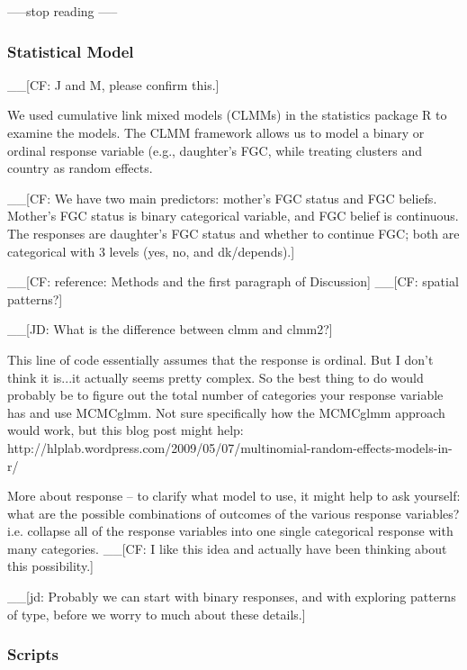 \documentclass[12pt,]{article}
\begin{document}
-----stop reading -----

\subsubsection{Statistical Model}\label{statistical-model}

\_\_{[}CF: J and M, please confirm this.{]} 

We used cumulative link mixed models (CLMMs) in the statistics package R \cite{Rstats,Rpackage_ordinal} to examine the models.  The CLMM framework allows us to model a binary or ordinal response variable (e.g., daughter's FGC, while treating clusters and country as random effects.

\_\_{[}CF: We have two main predictors:  mother's FGC status and FGC beliefs.  Mother's FGC status is binary categorical variable, and FGC belief is continuous.  The responses are daughter's FGC status and whether to continue FGC; both are categorical with 3 levels (yes, no, and dk/depends).{]} 

\_\_{[}CF: reference: Methods and the first paragraph of Discussion\cite{Chia14}{]}
\_\_{[}CF: spatial patterns?{]}

\_\_{[}JD: What is the difference between clmm and clmm2?{]}

This line of code essentially assumes that the response is ordinal. But I don't think it is...it actually seems pretty complex. So the best thing to do would probably be to figure out the total number of categories your response variable has and use MCMCglmm. Not sure specifically how the MCMCglmm approach would work, but this blog post might help: http://hlplab.wordpress.com/2009/05/07/multinomial-random-effects-models-in-r/

More about response -- to clarify what model to use, it might help to ask yourself: what are the possible combinations of outcomes of the various response variables?  i.e. collapse all of the response variables into one single categorical response with many categories. \_\_{[}CF: I like this idea and actually have been thinking about this possibility.{]}

\_\_{[}jd: Probably we can start with binary responses, and with exploring patterns of type, before we worry to much about these details.{]}

\subsubsection{Scripts}\label{scripts}
\end{document}
